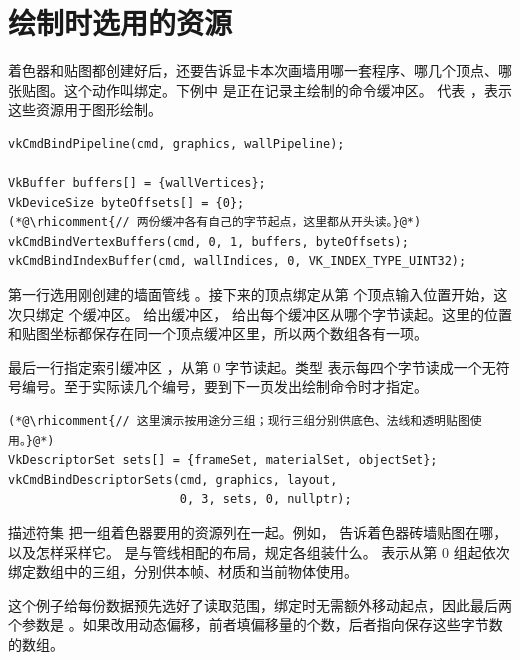 \clearpage
\begingroup
\setlength{\parskip}{8pt}
\section{绘制时选用的资源}\label{sec:bind-api}
着色器和贴图都创建好后，还要告诉显卡本次画墙用哪一套程序、哪几个顶点、哪张贴图。这个动作叫绑定。下例中  是正在记录主绘制的命令缓冲区。 代表 ，表示这些资源用于图形绘制。

\begin{lstlisting}
vkCmdBindPipeline(cmd, graphics, wallPipeline);

VkBuffer buffers[] = {wallVertices};
VkDeviceSize byteOffsets[] = {0};
(*@\rhicomment{// 两份缓冲各有自己的字节起点，这里都从开头读。}@*)
vkCmdBindVertexBuffers(cmd, 0, 1, buffers, byteOffsets);
vkCmdBindIndexBuffer(cmd, wallIndices, 0, VK_INDEX_TYPE_UINT32);
\end{lstlisting}

第一行选用刚创建的墙面管线 。接下来的顶点绑定从第  个顶点输入位置开始，这次只绑定  个缓冲区。 给出缓冲区， 给出每个缓冲区从哪个字节读起。这里的位置和贴图坐标都保存在同一个顶点缓冲区里，所以两个数组各有一项。

最后一行指定索引缓冲区 ，从第 0 字节读起。类型  表示每四个字节读成一个无符号编号。至于实际读几个编号，要到下一页发出绘制命令时才指定。

\begin{lstlisting}
(*@\rhicomment{// 这里演示按用途分三组；现行三组分别供底色、法线和透明贴图使用。}@*)
VkDescriptorSet sets[] = {frameSet, materialSet, objectSet};
vkCmdBindDescriptorSets(cmd, graphics, layout,
                        0, 3, sets, 0, nullptr);
\end{lstlisting}

描述符集 把一组着色器要用的资源列在一起。例如， 告诉着色器砖墙贴图在哪，以及怎样采样它。 是与管线相配的布局，规定各组装什么。 表示从第 0 组起依次绑定数组中的三组，分别供本帧、材质和当前物体使用。

这个例子给每份数据预先选好了读取范围，绑定时无需额外移动起点，因此最后两个参数是 。如果改用动态偏移，前者填偏移量的个数，后者指向保存这些字节数的数组。

